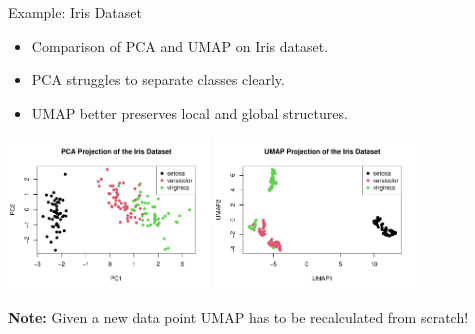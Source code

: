 \documentclass[11pt,handout,aspectratio=169]{beamer}
\begin{document}
\begin{frame}{Example: Iris Dataset}
\begin{itemize}
    \item Comparison of PCA and UMAP on Iris dataset.
    \item PCA struggles to separate classes clearly.
    \item UMAP better preserves local and global structures.
\end{itemize}
\begin{center}
    \includegraphics[width=0.4\textwidth]{pics/iris_pca.pdf}
    \includegraphics[width=0.4\textwidth]{pics/iris_umap.pdf}
\end{center}
\alert{\textbf{Note:}} Given a new data point UMAP has to be recalculated from scratch!
\end{frame}
\end{document}
